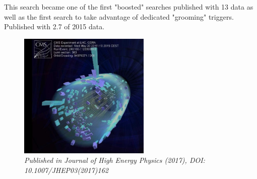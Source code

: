 \begin{centering}
{This search became one of the first "boosted" searches published with 13 \TeV data as well as the first search to take advantage of dedicated "grooming" triggers. Published with 2.7 \fbinv of 2015 data.
}
\begin{figure}[b!] 
    \centering
    \includegraphics[height=6cm]{figures/analysis/search1/misc/first_coll.png}
    \vspace*{10mm}
    \caption*{\footnotesize{\textit{Published in Journal of High Energy Physics (2017), DOI: 10.1007/JHEP03(2017)162}}}
\end{figure}
\end{centering}

\clearpage

\clearpage



